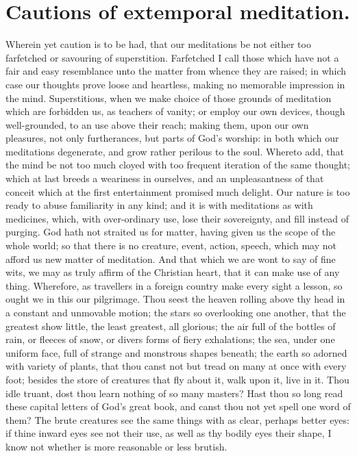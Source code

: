 \section{Cautions of extemporal meditation.}
Wherein yet caution is to be had, that our meditations be not either too farfetched or savouring of superstition. Farfetched I call those which have not a fair and easy resemblance unto the matter from whence they are raised; in which case our thoughts prove loose and heartless, making no memorable impression in the mind. Superstitious, when we make choice of those grounds of meditation which are forbidden us, as teachers of vanity; or employ our own devices, though well-grounded, to an use above their reach; making them, upon our own pleasures, not only furtherances, but parts of God's worship: in both which our meditations degenerate, and grow rather perilous to the soul. Whereto add, that the mind be not too much cloyed with too frequent iteration of the same thought; which at last breeds a weariness in ourselves, and an unpleasantness of that conceit which at the first entertainment promised much delight. Our nature is too ready to abuse familiarity in any kind; and it is with meditations as with medicines, which, with over-ordinary use, lose their sovereignty, and fill instead of purging. God hath not straited us for matter, having given us the scope of the whole world; so that there is no creature, event, action, speech, which may not afford us new matter of meditation. And that which we are wont to say of fine wits, we may as truly affirm of the Christian heart, that it can make use of any thing. Wherefore, as travellers in a foreign country make every sight a lesson, so ought we in this our pilgrimage. Thou seest the heaven rolling above thy head in a constant and unmovable motion; the stars so overlooking one another, that the greatest show little, the least greatest, all glorious; the air full of the bottles of rain, or fleeces of snow, or divers forms of fiery exhalations; the sea, under one uniform face, full of strange and monstrous shapes beneath; the earth so adorned with variety of plants, that thou canst not but tread on many at once with every foot; besides the store of creatures that fly about it, walk upon it, live in it. Thou idle truant, dost thou learn nothing of so many masters? Hast thou so long read these capital letters of God's great book, and canst thou not yet spell one word of them? The brute creatures see the same things with as clear, perhaps better eyes: if thine inward eyes see not their use, as well as thy bodily eyes their shape, I know not whether is more reasonable or less brutish. 

